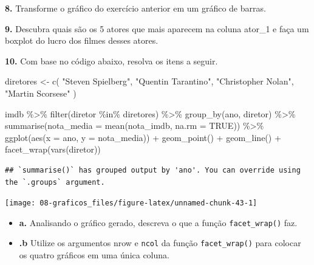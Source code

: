 \documentclass[
]{book}
\newenvironment{Shaded}{\begin{snugshade}}{\end{snugshade}}
\newcommand{\AttributeTok}[1]{\textcolor[rgb]{0.77,0.63,0.00}{#1}}
\newcommand{\ConstantTok}[1]{\textcolor[rgb]{0.00,0.00,0.00}{#1}}
\newcommand{\FunctionTok}[1]{\textcolor[rgb]{0.00,0.00,0.00}{#1}}
\newcommand{\NormalTok}[1]{#1}
\newcommand{\OtherTok}[1]{\textcolor[rgb]{0.56,0.35,0.01}{#1}}
\newcommand{\SpecialCharTok}[1]{\textcolor[rgb]{0.00,0.00,0.00}{#1}}
\newcommand{\StringTok}[1]{\textcolor[rgb]{0.31,0.60,0.02}{#1}}
\begin{document}
\textbf{8.} Transforme o gráfico do exercício anterior em um gráfico de barras.

\textbf{9.} Descubra quais são os 5 atores que mais aparecem na coluna ator\_1 e faça um boxplot do lucro dos filmes desses atores.

\textbf{10.} Com base no código abaixo, resolva os itens a seguir.

\begin{Shaded}
\begin{Highlighting}[]
\NormalTok{diretores }\OtherTok{\textless{}{-}} \FunctionTok{c}\NormalTok{(}
  \StringTok{"Steven Spielberg"}\NormalTok{, }
  \StringTok{"Quentin Tarantino"}\NormalTok{, }
  \StringTok{"Christopher Nolan"}\NormalTok{,}
  \StringTok{"Martin Scorsese"}
\NormalTok{)}

\NormalTok{imdb }\SpecialCharTok{\%\textgreater{}\%} 
  \FunctionTok{filter}\NormalTok{(diretor }\SpecialCharTok{\%in\%}\NormalTok{ diretores) }\SpecialCharTok{\%\textgreater{}\%} 
  \FunctionTok{group\_by}\NormalTok{(ano, diretor) }\SpecialCharTok{\%\textgreater{}\%} 
  \FunctionTok{summarise}\NormalTok{(}\AttributeTok{nota\_media =} \FunctionTok{mean}\NormalTok{(nota\_imdb, }\AttributeTok{na.rm =} \ConstantTok{TRUE}\NormalTok{)) }\SpecialCharTok{\%\textgreater{}\%} 
  \FunctionTok{ggplot}\NormalTok{(}\FunctionTok{aes}\NormalTok{(}\AttributeTok{x =}\NormalTok{ ano, }\AttributeTok{y =}\NormalTok{ nota\_media)) }\SpecialCharTok{+}
  \FunctionTok{geom\_point}\NormalTok{() }\SpecialCharTok{+}
  \FunctionTok{geom\_line}\NormalTok{() }\SpecialCharTok{+}
  \FunctionTok{facet\_wrap}\NormalTok{(}\FunctionTok{vars}\NormalTok{(diretor))}
\end{Highlighting}
\end{Shaded}

\begin{verbatim}
## `summarise()` has grouped output by 'ano'. You can override using the `.groups` argument.
\end{verbatim}

\begin{center}\texttt{[image: 08-graficos\_files/figure-latex/unnamed-chunk-43-1]} \end{center}

\begin{itemize}
\item
  \textbf{a.} Analisando o gráfico gerado, descreva o que a função \texttt{facet\_wrap()} faz.
\item
  \textbf{.b} Utilize os argumentos nrow e \texttt{ncol} da função \texttt{facet\_wrap()} para colocar os quatro gráficos em uma única coluna.
\end{itemize}
\end{document}
